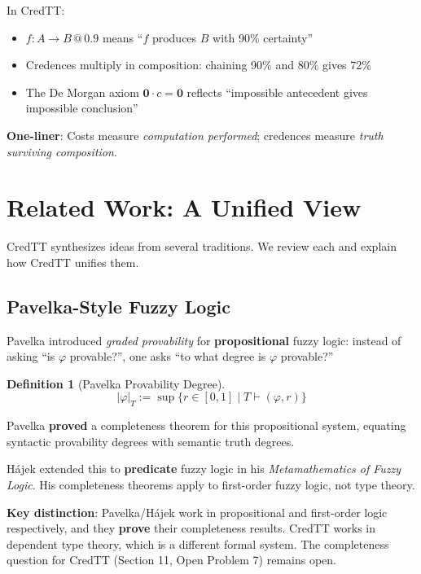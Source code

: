 \documentclass[11pt,a4paper]{article}
\makeatletter
\newtheorem{definition}{Definition}[section]
\newcommand{\at}[1]{\,@\,#1}
\newcommand{\zero}{\mathbf{0}}
\makeatother
\begin{document}
In CredTT:
\begin{itemize}
    \item $f : A \to B \at{0.9}$ means ``$f$ produces $B$ with 90\% certainty''
    \item Credences multiply in composition: chaining 90\% and 80\% gives 72\%
    \item The De Morgan axiom $\zero \cdot c = \zero$ reflects ``impossible antecedent gives impossible conclusion''
\end{itemize}

\textbf{One-liner}: Costs measure \emph{computation performed}; credences measure \emph{truth surviving composition}.

\section{Related Work: A Unified View}

CredTT synthesizes ideas from several traditions. We review each and explain how CredTT unifies them.

\subsection{Pavelka-Style Fuzzy Logic}

Pavelka \citep{pavelka1979fuzzy} introduced \emph{graded provability} for \textbf{propositional} fuzzy logic: instead of asking ``is $\varphi$ provable?'', one asks ``to what degree is $\varphi$ provable?''

\begin{definition}[Pavelka Provability Degree]
\[
|\varphi|_T := \sup\{r \in [0,1] \mid T \vdash (\varphi, r)\}
\]
\end{definition}

Pavelka \textbf{proved} a completeness theorem for this propositional system, equating syntactic provability degrees with semantic truth degrees.

H\'ajek \citep{hajek1998metamathematics} extended this to \textbf{predicate} fuzzy logic in his \emph{Metamathematics of Fuzzy Logic}. His completeness theorems apply to first-order fuzzy logic, not type theory.

\textbf{Key distinction}: Pavelka/H\'ajek work in propositional and first-order logic respectively, and they \textbf{prove} their completeness results. CredTT works in dependent type theory, which is a different formal system. The completeness question for CredTT (Section 11, Open Problem 7) remains open.
\end{document}
